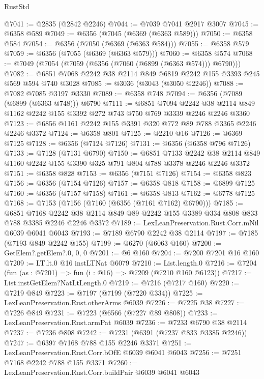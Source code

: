 \begin{lexlean}{RustStd}
\begin{coremodule}
@7041 := @2835 (@2842 @2246)
@7044 := @7039 @7041 @2917 @3007
@7045 := @6358 @589
@7049 := @6356 (@7045 (@6369 (@6363 @589)))
@7050 := @6358 @584
@7054 := @6356 (@7050 (@6369 (@6363 @584)))
@7055 := @6358 @579
@7059 := @6356 (@7055 (@6369 (@6363 @579)))
@7060 := @6358 @574
@7068 := @7049 (@7054 (@7059 (@6356 (@7060 (@6899 (@6363 @574))) @6790)))
@7082 := @6851 @7068 @2242 @38 @2114 @849 @6819 @2242 @155 @3393 @245 @569 @594 @740 @3028
@7085 := @3036 (@3043 (@3050 @2246))
@7088 := @7082 @7085 @3197 @3330
@7089 := @6358 @748
@7094 := @6356 (@7089 (@6899 (@6363 @748))) @6790
@7111 := @6851
    @7094
    @2242
    @38
    @2114
    @849
    @1162
    @2242
    @155
    @3392
    @272
    @743
    @750
    @769
    @3339
    @2246
    @2246
    @3360
@7123 := @6856 @1161 @2242 @155 @3391 @320 @772 @89 @788 @3365 @2246 @2246 @3372
@7124 := @6358 @801
@7125 := @2210 @16
@7126 := @6369 @7125
@7128 := @6356 (@7124 @7126)
@7131 := @6356 (@6358 @796 @7126)
@7133 := @7128 (@7131 @6790)
@7150 := @6851
    @7133
    @2242
    @38
    @2114
    @849
    @1160
    @2242
    @155
    @3390
    @325
    @791
    @804
    @788
    @3378
    @2246
    @2246
    @3372
@7151 := @6358 @828
@7153 := @6356 (@7151 @7126)
@7154 := @6358 @823
@7156 := @6356 (@7154 @7126)
@7157 := @6358 @818
@7158 := @6899 @7125
@7160 := @6356 (@7157 @7158)
@7161 := @6358 @813
@7162 := @6778 @7125
@7168 := @7153 (@7156 (@7160 (@6356 (@7161 @7162) @6790)))
@7185 := @6851
    @7168
    @2242
    @38
    @2114
    @849
    @89
    @2242
    @155
    @3389
    @334
    @808
    @833
    @788
    @3385
    @2246
    @2246
    @3372
@7189 := LexLeanPreservation.Rust.Corr.mNil @6039 @6041 @6043
@7193 := @7189 @6790 @2242 @38 @2114
@7197 := @7185 (@7193 @849 @2242 @155)
@7199 := @6270 (@6063 @160)
@7200 := GetElem?.getElem?.{0, 0, 0}
@7201 := @6 @160
@7204 := @7200 @7201 @16 @160
@7209 := LT.lt.{0} @16 instLTNat @6079
@7210 := List.length.{0}
@7216 := @7204 (fun (as : @7201) => fun (i : @16) => @7209 (@7210 @160 @6123))
@7217 := List.instGetElem?NatLtLength.{0}
@7219 := @7216 (@7217 @160)
@7220 := @7219 @849
@7223 := @7197 (@7199 (@7220 @334))
@7225 := LexLeanPreservation.Rust.otherArms @6039
@7226 := @7225 @38
@7227 := @7226 @849
@7231 := @7223 (@6566 (@7227 @89 @808))
@7233 := LexLeanPreservation.Rust.armPat @6039
@7236 := @7233 @6790 @38 @2114
@7237 := @7236 @808
@7242 := @7231 (@6391 (@7237 @833 @3385 @2246))
@7247 := @6397 @7168 @788 @155 @2246 @3371
@7251 := LexLeanPreservation.Rust.Corr.bOfE @6039 @6041 @6043
@7256 := @7251 @7168 @2242 @788 @155 @3371
@7260 := LexLeanPreservation.Rust.Corr.buildPair @6039 @6041 @6043

\end{coremodule}
\end{lexlean}
